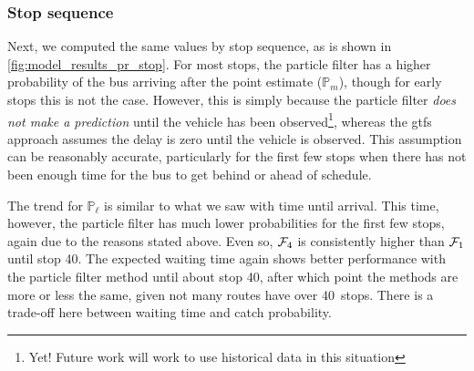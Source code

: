 \subsubsection{Stop sequence}

Next, we computed the same values by stop sequence, as is shown in \cref{fig:model_results_pr_stop}. For most stops, the particle filter has a higher probability of the bus arriving after the point estimate ($\mathbb{P}_m$), though for early stops this is not the case. However, this is simply because the particle filter \emph{does not make a prediction} until the vehicle has been observed\footnote{Yet! Future work will work to use historical data in this situation}, whereas the \gls{gtfs} approach assumes the delay is zero until the vehicle is observed. This assumption can be reasonably accurate, particularly for the first few stops when there has not been enough time for the bus to get behind or ahead of schedule.

The trend for $\mathbb{P}_\ell$ is similar to what we saw with time until arrival. This time, however, the particle filter has much lower probabilities for the first few stops, again due to the reasons stated above. Even so, $\mathcal{F}_4$ is consistently higher than $\mathcal{F}_1$ until stop 40. The expected waiting time again shows better performance with the particle filter method until about stop 40, after which point the methods are more or less the same, given not many routes have over 40~stops. There is a trade-off here between waiting time and catch probability.


